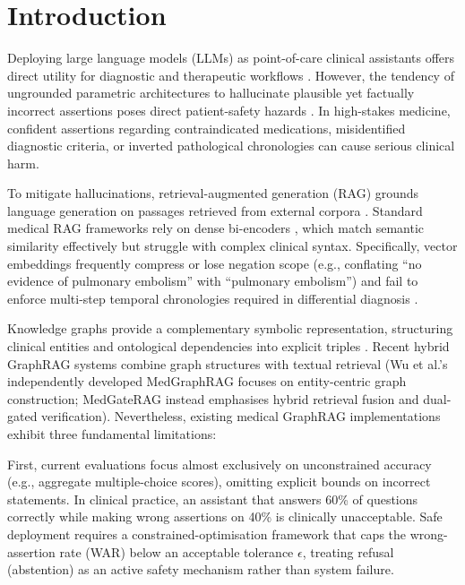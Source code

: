 \documentclass[preprint,12pt,a4paper]{elsarticle}
\begin{document}
\doublespacing
\linenumbers   %

\section{Introduction}
\label{sec:intro}

Deploying large language models (LLMs) as point-of-care clinical assistants offers
direct utility for diagnostic and therapeutic workflows
\citep{singhal2023med,thirunavukarasu2023llms}. However, the tendency of ungrounded
parametric architectures to hallucinate plausible yet factually incorrect assertions
poses direct patient-safety hazards \citep{bai2024hallucination}. In high-stakes
medicine, confident assertions regarding contraindicated medications, misidentified
diagnostic criteria, or inverted pathological chronologies can cause serious clinical
harm.

To mitigate hallucinations, retrieval-augmented generation (RAG) grounds language
generation on passages retrieved from external corpora \citep{lewis2020rag,gu2021domain}.
Standard medical RAG frameworks rely on dense bi-encoders \citep{jin2023medcpt,gao2024agentic},
which match semantic similarity effectively but struggle with complex clinical syntax.
Specifically, vector embeddings frequently compress or lose negation scope
(e.g., conflating ``no evidence of pulmonary embolism'' with ``pulmonary embolism'')
and fail to enforce multi-step temporal chronologies required in differential
diagnosis \citep{han2022umls_negation,mallen2022entitypop}.

Knowledge graphs provide a complementary symbolic representation, structuring
clinical entities and ontological dependencies into explicit triples
\citep{bodenreider2004umls,yasunaga2022qagnn}. Recent hybrid GraphRAG systems
combine graph structures with textual retrieval
\citep{edge2024graphrag,he2022rethinking,sun2024medgraphrag_conf} (Wu et al.'s independently developed MedGraphRAG focuses on entity-centric graph construction; MedGateRAG instead emphasises hybrid retrieval fusion and dual-gated verification). Nevertheless, existing medical GraphRAG
implementations exhibit three fundamental limitations:

First, current evaluations focus almost exclusively on unconstrained accuracy (e.g.,
aggregate multiple-choice scores), omitting explicit bounds on incorrect statements.
In clinical practice, an assistant that answers 60\% of questions correctly while
making wrong assertions on 40\% is clinically unacceptable. Safe deployment requires
a constrained-optimisation framework that caps the wrong-assertion rate (WAR) below
an acceptable tolerance $\epsilon$, treating refusal (abstention) as an active
safety mechanism rather than system failure.
\end{document}

